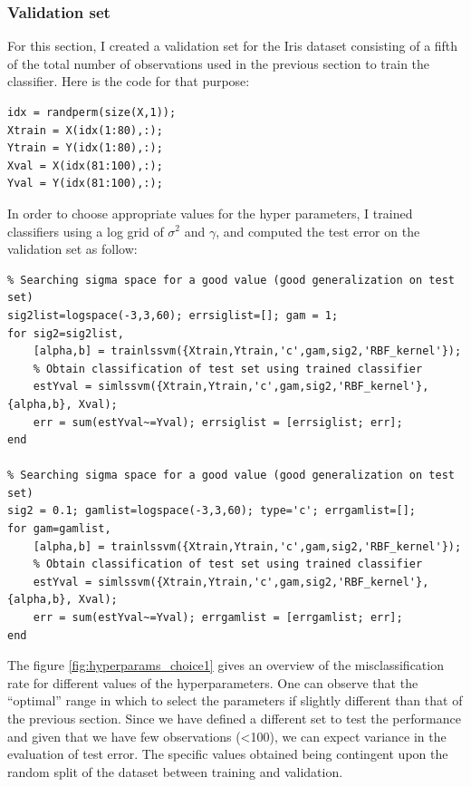 \documentclass[11pt, a4paper]{article}
\begin{document}
\subsubsection{Validation set}

For this section, I created a validation set for the Iris dataset
consisting of a fifth of the total number of observations used in the
previous section to train the classifier. Here is the code for that
purpose:

\begin{lstlisting}
idx = randperm(size(X,1));
Xtrain = X(idx(1:80),:);
Ytrain = Y(idx(1:80),:);
Xval = X(idx(81:100),:);
Yval = Y(idx(81:100),:);
\end{lstlisting}

In order to choose appropriate values for the hyper parameters, I
trained classifiers using a log grid of $\sigma^2$ and $\gamma$, and
computed the test error on the validation set as follow:

\begin{lstlisting}
% Searching sigma space for a good value (good generalization on test set)
sig2list=logspace(-3,3,60); errsiglist=[]; gam = 1;
for sig2=sig2list,
    [alpha,b] = trainlssvm({Xtrain,Ytrain,'c',gam,sig2,'RBF_kernel'});
    % Obtain classification of test set using trained classifier
    estYval = simlssvm({Xtrain,Ytrain,'c',gam,sig2,'RBF_kernel'}, {alpha,b}, Xval);
    err = sum(estYval~=Yval); errsiglist = [errsiglist; err]; 
end

% Searching sigma space for a good value (good generalization on test set)
sig2 = 0.1; gamlist=logspace(-3,3,60); type='c'; errgamlist=[];
for gam=gamlist,
    [alpha,b] = trainlssvm({Xtrain,Ytrain,'c',gam,sig2,'RBF_kernel'});
    % Obtain classification of test set using trained classifier
    estYval = simlssvm({Xtrain,Ytrain,'c',gam,sig2,'RBF_kernel'}, {alpha,b}, Xval);
    err = sum(estYval~=Yval); errgamlist = [errgamlist; err];
end
\end{lstlisting}

The figure \ref{fig:hyperparams_choice1} gives an overview of the
misclassification rate for different values of the
hyperparameters. One can observe that the ``optimal'' range in which
to select the parameters if slightly different than that of the
previous section. Since we have defined a different set to test the
performance and given that we have few observations (\textless 100),
we can expect variance in the evaluation of test error. The specific
values obtained being contingent upon the random split of the dataset
between training and validation.
\end{document}
